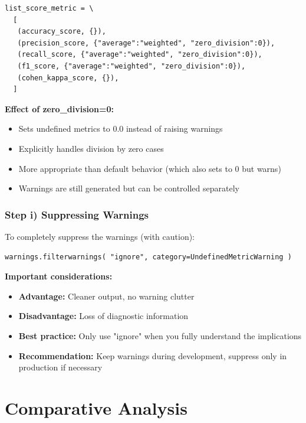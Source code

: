 \documentclass[12pt,a4paper]{article}
\begin{document}
\begin{lstlisting}[caption={Adding zero\_division parameter}]
list_score_metric = \
  [
   (accuracy_score, {}),
   (precision_score, {"average":"weighted", "zero_division":0}),
   (recall_score, {"average":"weighted", "zero_division":0}),
   (f1_score, {"average":"weighted", "zero_division":0}),
   (cohen_kappa_score, {}),
  ]
\end{lstlisting}

\textbf{Effect of zero\_division=0:}
\begin{itemize}
    \item Sets undefined metrics to 0.0 instead of raising warnings
    \item Explicitly handles division by zero cases
    \item More appropriate than default behavior (which also sets to 0 but warns)
    \item Warnings are still generated but can be controlled separately
\end{itemize}

\subsubsection{Step i) Suppressing Warnings}

To completely suppress the warnings (with caution):

\begin{lstlisting}[caption={Suppressing UndefinedMetricWarning}]
warnings.filterwarnings( "ignore", category=UndefinedMetricWarning )
\end{lstlisting}

\textbf{Important considerations:}
\begin{itemize}
    \item \textbf{Advantage:} Cleaner output, no warning clutter
    \item \textbf{Disadvantage:} Loss of diagnostic information
    \item \textbf{Best practice:} Only use "ignore" when you fully understand the implications
    \item \textbf{Recommendation:} Keep warnings during development, suppress only in production if necessary
\end{itemize}

\section{Comparative Analysis}
\end{document}
